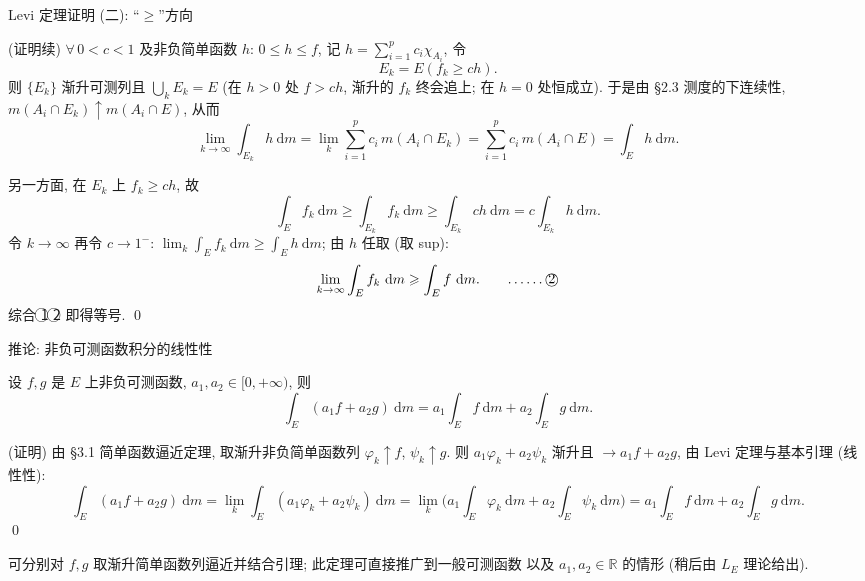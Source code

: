 
\begin{frame}{Levi 定理证明 (二): ``$\geqslant$''方向}

\startproof[bg=yellow, fg=red](证明续)
$\forall\, 0 < c < 1$ 及非负简单函数 $h$: $0 \leqslant h \leqslant f$,
记 $h = \sum_{i=1}^{p} c_i \chi_{A_i}$, 令
\[
E_k = E(f_k \geqslant c h).
\]
则 $\{E_k\}$ \alert{渐升}可测列且 $\bigcup_k E_k = E$
(在 $h > 0$ 处 $f > ch$, 渐升的 $f_k$ 终会追上; 在 $h = 0$ 处恒成立).
于是由 §2.3 测度的下连续性, $m(A_i \cap E_k) \uparrow m(A_i \cap E)$, 从而
\[
\lim_{k \to \infty} \int_{E_k} h ~ \mathrm{d} m
= \lim_{k} \sum_{i=1}^{p} c_i\, m(A_i \cap E_k)
= \sum_{i=1}^{p} c_i\, m(A_i \cap E)
= \int_E h ~ \mathrm{d} m .
\]

\pause

另一方面, 在 $E_k$ 上 $f_k \geqslant ch$, 故
\[
\int_E f_k ~ \mathrm{d} m
\geqslant \int_{E_k} f_k ~ \mathrm{d} m
\geqslant \int_{E_k} c h ~ \mathrm{d} m
= c \int_{E_k} h ~ \mathrm{d} m .
\]
令 $k \to \infty$ 再令 $c \to 1^-$:
$\displaystyle \lim_k \int_E f_k ~ \mathrm{d} m \geqslant \int_E h ~ \mathrm{d} m$;
由 $h$ 任取 (取 sup):
\[
\lim_{k \to \infty} \int_E f_k ~ \mathrm{d} m \geqslant \int_E f ~ \mathrm{d} m .
\qquad \text{……\textcircled{2}}
\]
综合 \textcircled{1} \textcircled{2} 即得等号. \qed

\end{frame}


\begin{frame}{推论: 非负可测函数积分的线性性}

\begin{thm}
设 $f, g$ 是 $E$ 上非负可测函数, $a_1, a_2 \in [0, +\infty)$, 则
\[
\int_E (a_1 f + a_2 g) ~ \mathrm{d} m
= a_1 \int_E f ~ \mathrm{d} m + a_2 \int_E g ~ \mathrm{d} m .
\]
\end{thm}

\startproof[bg=yellow, fg=red](证明)
由 §3.1 简单函数逼近定理, 取渐升非负简单函数列 $\varphi_k \uparrow f$, $\psi_k \uparrow g$.
则 $a_1 \varphi_k + a_2 \psi_k$ 渐升且 $\to a_1 f + a_2 g$, 由 Levi 定理与基本引理 (线性性):
\[
\int_E (a_1 f + a_2 g) ~ \mathrm{d} m
= \lim_k \int_E (a_1 \varphi_k + a_2 \psi_k) ~ \mathrm{d} m
= \lim_k \Big( a_1 \int_E \varphi_k ~ \mathrm{d} m + a_2 \int_E \psi_k ~ \mathrm{d} m \Big)
= a_1 \int_E f ~ \mathrm{d} m + a_2 \int_E g ~ \mathrm{d} m .
\]
\qed

\pause

\begin{remark}
可分别对 $f, g$ 取渐升简单函数列逼近并结合引理; 此定理可直接推广到\alert{一般可测函数}
以及 $a_1, a_2 \in \mathbb{R}$ 的情形 (稍后由 $L_E$ 理论给出).
\end{remark}

\end{frame}

